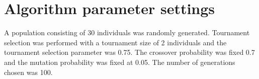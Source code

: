 \documentclass[ExampleMasters.tex]{subfiles}
\begin{document}
	\section{Algorithm parameter settings}
		A population consisting of 30 individuals was randomly generated. Tournament selection was performed with a tournament size of 2 individuals and the tournament selection parameter was 0.75. The crossover probability was fixed 0.7 and the mutation probability was fixed at 0.05. The number of generations chosen was 100.\\
\end{document}
